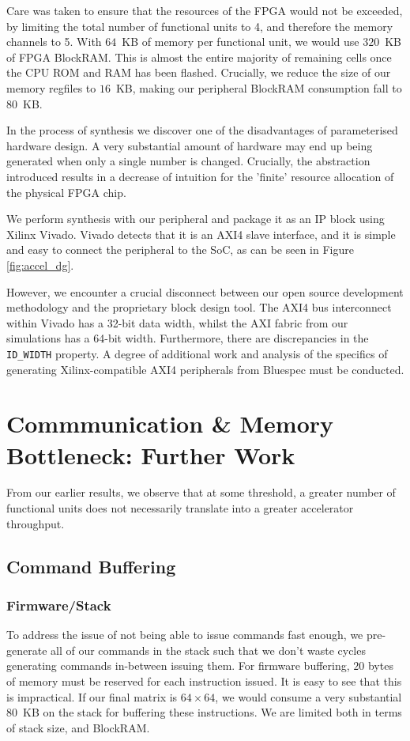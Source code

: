 \documentclass[a4paper,8pt]{report}
\begin{document}
Care was taken to ensure that the resources of the FPGA would not be exceeded,
by limiting the total number of functional units to 4, and therefore the memory
channels to 5. With $64$~KB of memory per functional unit, we would use $320$~KB of FPGA
BlockRAM. This is almost the entire majority of remaining cells once the CPU ROM
and RAM has been flashed. Crucially, we reduce the size of our memory regfiles
to $16$~KB, making our peripheral BlockRAM consumption fall to $80$~KB.

In the process of synthesis we discover one of the disadvantages of
parameterised hardware design. A very substantial amount of hardware may end up
being generated when only a single number is changed. Crucially, the abstraction
introduced results in a decrease of intuition for the 'finite' resource
allocation of the physical FPGA chip.

We perform synthesis with our peripheral and package it as an IP block using
Xilinx Vivado. Vivado detects that it is an AXI4 slave interface, and it is
simple and easy to connect the peripheral to the SoC, as can be seen in Figure
\ref{fig:accel_dg}.

However, we encounter a crucial disconnect between our open source development
methodology and the proprietary block design tool. The AXI4 bus interconnect within
Vivado has a 32-bit data width, whilst the AXI fabric from our simulations has a
64-bit width. Furthermore, there are discrepancies in the \texttt{ID\_WIDTH}
property. A degree of additional work and analysis of the specifics of
generating Xilinx-compatible AXI4 peripherals from Bluespec must be conducted.

\chapter{Commmunication \& Memory Bottleneck: Further Work}
From our earlier results, we observe that at some threshold, a greater number of
functional units does not necessarily translate into a greater accelerator
throughput. 

\section{Command Buffering}
\subsection{Firmware/Stack}
To address the issue of not being able to issue commands fast enough, we
pre-generate all of our commands in the stack such that we don't waste cycles
generating commands in-between issuing them. For firmware buffering, $20$ bytes of
memory must be reserved for each instruction issued. It is easy to see that this
is impractical. If our final matrix is $64\times 64$, we would consume a very
substantial $80$~KB on the stack for buffering these instructions. We are
limited both in terms of stack size, and BlockRAM. 
\end{document}
